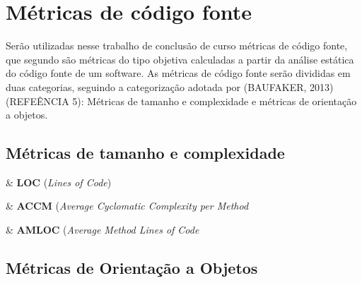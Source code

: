 \section{Métricas de código fonte}

Serão utilizadas nesse trabalho de conclusão de curso métricas de código fonte, que segundo \cite{Meirelles2013} são métricas do tipo objetiva calculadas a partir da análise estática do código fonte de um software. As métricas de código fonte serão divididas em duas categorias, seguindo a categorização adotada por (BAUFAKER, 2013) (REFEÊNCIA 5): Métricas de tamanho e complexidade e métricas de orientação a objetos.

\subsection{Métricas de tamanho e complexidade}

\begin{easylist}[itemize]

	& \textbf{LOC} (\textit{Lines of Code})
		
	& \textbf{ACCM} (\textit{Average Cyclomatic Complexity per Method}

	& \textbf{AMLOC} (\textit{Average Method Lines of Code}
	
\end{easylist}



\subsection{Métricas de Orientação a Objetos}


